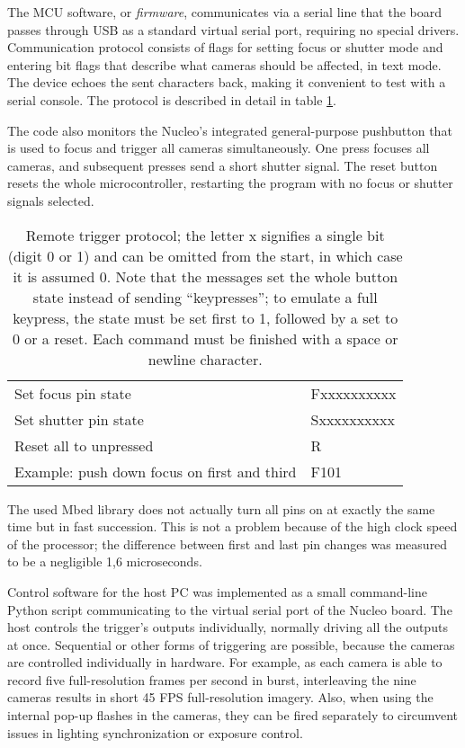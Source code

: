 The MCU software, or \emph{firmware}, communicates via a serial line that the board passes through USB as a standard virtual serial port, requiring no special drivers.
Communication protocol consists of flags for setting focus or shutter mode and entering bit flags that describe what cameras should be affected, in text mode.
The device echoes the sent characters back, making it convenient to test with a serial console.
The protocol is described in detail in table \ref{tab:triggerprotocol}.

The code also monitors the Nucleo's integrated general-purpose pushbutton that is used to focus and trigger all cameras simultaneously.
One press focuses all cameras, and subsequent presses send a short shutter signal.
The reset button resets the whole microcontroller, restarting the program with no focus or shutter signals selected.

\begin{table}[h]
	\centering
	\begin{tabular}{l l}
		Set focus pin state & Fxxxxxxxxxx\\
		Set shutter pin state & Sxxxxxxxxxx\\
		Reset all to unpressed & R\\
		Example: push down focus on first and third & F101\\
	\end{tabular}
	\caption{
		Remote trigger protocol; the letter x signifies a single bit (digit 0 or 1) and can be omitted from the start, in which case it is assumed 0.
		Note that the messages set the whole button state instead of sending ``keypresses'';
		to emulate a full keypress, the state must be set first to 1, followed by a set to 0 or a reset.
		Each command must be finished with a space or newline character.
	}
	\label{tab:triggerprotocol}
\end{table}

The used Mbed library does not actually turn all pins on at exactly the same time but in fast succession.
This is not a problem because of the high clock speed of the processor;
the difference between first and last pin changes was measured to be a negligible 1,6 microseconds.

Control software for the host PC was implemented as a small command-line Python script communicating to the virtual serial port of the Nucleo board.
The host controls the trigger's outputs individually, normally driving all the outputs at once.
Sequential or other forms of triggering are possible, because the cameras are controlled individually in hardware.
For example, as each camera is able to record five full-resolution frames per second in burst, interleaving the nine cameras results in short 45 FPS full-resolution imagery.
Also, when using the internal pop-up flashes in the cameras, they can be fired separately to circumvent issues in lighting synchronization or exposure control.

